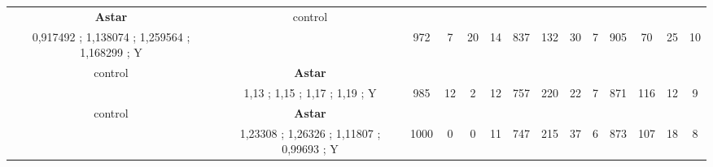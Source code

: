 \begin{table}[]
{\begin{tabular}{|c|c|c|c|c|c|c|c|c|c|c|c|c|c|}
\cellcolor{blue!15}\textbf{Astar} & control& {\color[HTML]{00009B} } & {\color[HTML]{9A0000} } & {\color[HTML]{009901} } &  & {\color[HTML]{00009B} } & {\color[HTML]{9A0000} } & {\color[HTML]{009901} } &  & {\color[HTML]{00009B} } & {\color[HTML]{9A0000} } & {\color[HTML]{009901} } &  \\ 
\cellcolor{ blue!15}0,917492 ; 1,138074 ; 1,259564 ; 1,168299 ; Y &  & \multirow{-2}{*}{{\color[HTML]{00009B} 972}} & \multirow{-2}{*}{{\color[HTML]{9A0000} 7}} & \multirow{-2}{*}{{\color[HTML]{009901} 20}} & \multirow{-2}{*}{14} & \multirow{-2}{*}{{\color[HTML]{00009B} 837}} & \multirow{-2}{*}{{\color[HTML]{9A0000} 132}} & \multirow{-2}{*}{{\color[HTML]{009901} 30}} & \multirow{-2}{*}{7} & \multirow{-2}{*}{{\color[HTML]{00009B} 905}} & \multirow{-2}{*}{{\color[HTML]{9A0000} 70}} & \multirow{-2}{*}{{\color[HTML]{009901} 25}} & \multirow{-2}{*}{10} \\ \hline

control & \cellcolor{blue!15}\textbf{Astar}& {\color[HTML]{00009B} } & {\color[HTML]{9A0000} } & {\color[HTML]{009901} } &  & {\color[HTML]{00009B} } & {\color[HTML]{9A0000} } & {\color[HTML]{009901} } &  & {\color[HTML]{00009B} } & {\color[HTML]{9A0000} } & {\color[HTML]{009901} } &  \\ 
 & \cellcolor{ blue!15}1,13 ; 1,15 ; 1,17 ; 1,19 ; Y & \multirow{-2}{*}{{\color[HTML]{00009B} 985}} & \multirow{-2}{*}{{\color[HTML]{9A0000} 12}} & \multirow{-2}{*}{{\color[HTML]{009901} 2}} & \multirow{-2}{*}{12} & \multirow{-2}{*}{{\color[HTML]{00009B} 757}} & \multirow{-2}{*}{{\color[HTML]{9A0000} 220}} & \multirow{-2}{*}{{\color[HTML]{009901} 22}} & \multirow{-2}{*}{7} & \multirow{-2}{*}{{\color[HTML]{00009B} 871}} & \multirow{-2}{*}{{\color[HTML]{9A0000} 116}} & \multirow{-2}{*}{{\color[HTML]{009901} 12}} & \multirow{-2}{*}{9} \\ \hline

control & \cellcolor{blue!15}\textbf{Astar}& {\color[HTML]{00009B} } & {\color[HTML]{9A0000} } & {\color[HTML]{009901} } &  & {\color[HTML]{00009B} } & {\color[HTML]{9A0000} } & {\color[HTML]{009901} } &  & {\color[HTML]{00009B} } & {\color[HTML]{9A0000} } & {\color[HTML]{009901} } &  \\ 
 & \cellcolor{ blue!15}1,23308 ; 1,26326 ; 1,11807 ; 0,99693 ; Y & \multirow{-2}{*}{{\color[HTML]{00009B} 1000}} & \multirow{-2}{*}{{\color[HTML]{9A0000} 0}} & \multirow{-2}{*}{{\color[HTML]{009901} 0}} & \multirow{-2}{*}{11} & \multirow{-2}{*}{{\color[HTML]{00009B} 747}} & \multirow{-2}{*}{{\color[HTML]{9A0000} 215}} & \multirow{-2}{*}{{\color[HTML]{009901} 37}} & \multirow{-2}{*}{6} & \multirow{-2}{*}{{\color[HTML]{00009B} 873}} & \multirow{-2}{*}{{\color[HTML]{9A0000} 107}} & \multirow{-2}{*}{{\color[HTML]{009901} 18}} & \multirow{-2}{*}{8} \\ \hline


\end{tabular}}
\end{table}
